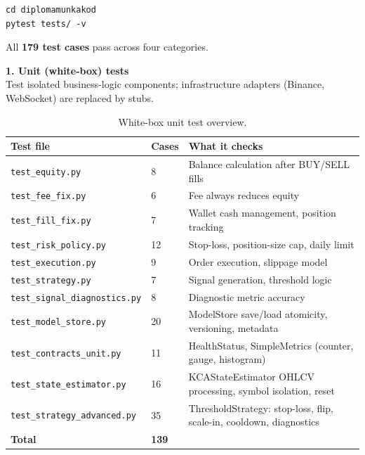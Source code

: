 \begin{verbatim}
cd diplomamunkakod
pytest tests/ -v
\end{verbatim}

All \textbf{179 test cases} pass across four categories.

\noindent\textbf{1. Unit (white-box) tests}\\
Test isolated business-logic components; infrastructure adapters
(Binance, WebSocket) are replaced by stubs.

\begin{table}[H]
  \centering
  \small
  \begin{tabular}{|l|l|p{6.5cm}|}
    \hline
    \textbf{Test file} & \textbf{Cases} & \textbf{What it checks} \\
    \hline\hline
    \texttt{test\_equity.py}              & 8  & Balance calculation after BUY/SELL fills \\
    \texttt{test\_fee\_fix.py}             & 6  & Fee always reduces equity \\
    \texttt{test\_fill\_fix.py}            & 7  & Wallet cash management, position tracking \\
    \texttt{test\_risk\_policy.py}         & 12 & Stop-loss, position-size cap, daily limit \\
    \texttt{test\_execution.py}           & 9  & Order execution, slippage model \\
    \texttt{test\_strategy.py}            & 7  & Signal generation, threshold logic \\
    \texttt{test\_signal\_diagnostics.py} & 8  & Diagnostic metric accuracy \\
    \texttt{test\_model\_store.py}         & 20 & ModelStore save/load atomicity, versioning, metadata \\
    \texttt{test\_contracts\_unit.py}      & 11 & HealthStatus, SimpleMetrics (counter, gauge, histogram) \\
    \texttt{test\_state\_estimator.py}     & 16 & KCAStateEstimator OHLCV processing, symbol isolation, reset \\
    \texttt{test\_strategy\_advanced.py}  & 35 & ThresholdStrategy: stop-loss, flip, scale-in, cooldown, diagnostics \\
    \hline
    \textbf{Total} & \textbf{139} & \\
    \hline
  \end{tabular}
  \caption{White-box unit test overview.}
  \label{tab:unit_tests}
\end{table}

